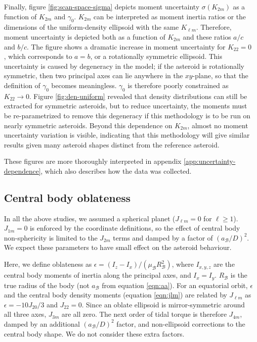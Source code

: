 \documentclass[fleqn,usenatbib]{mnras}
\begin{document}
Finally, figure \ref{fig:scan-space-sigma} depicts moment uncertainty $\sigma(K_{2m})$ as a function of $K_{2m}$ and $\gamma_0$. $K_{2m}$ can be interpreted as moment inertia ratios or the dimensions of the uniform-density ellipsoid with the same $K_{\ell m}$. Therefore, moment uncertainty is depicted both as a function of $K_{2m}$ and these ratios $a/c$ and $b/c$. The figure shows a dramatic increase in moment uncertainty for $K_{22} = 0$, which corresponds to $a=b$, or a rotationally symmetric ellipsoid. This uncertainty is caused by degeneracy in the model; if the asteroid is rotationally symmetric, then two principal axes can lie anywhere in the $xy$-plane, so that the definition of $\gamma_0$ becomes meaningless. $\gamma_0$ is therefore poorly constrained as $K_{22} \rightarrow 0$. Figure \ref{fig:den-uniform} revealed that density distributions can still be extracted for symmetric asteroids, but to reduce uncertainty, the moments must be re-parametrized to remove this degeneracy if this methodology is to be run on nearly symmetric asteroids. Beyond this dependence on $K_{2m}$, almost no moment uncertainty variation is visible, indicating that this methodology will give similar results given many asteroid shapes distinct from the reference asteroid.

These figures are more thoroughly interpreted in appendix \ref{app:uncertainty-dependence}, which also describes how the data was collected.


\subsection{Central body oblateness}
\label{sec:scan-oblateness}

In all the above studies, we assumed a spherical planet ($J_{\ell m} = 0$ for $\ell \geq 1$). $J_{1m} = 0$ is enforced by the coordinate definitions, so the effect of central body non-sphericity is limited to the $J_{2m}$ terms and damped by a factor of $(a_\mathcal{B} / D)^2$. We expect these parameters to have small effect on the asteroid behaviour.

Here, we define oblateness as $\epsilon = (I_z - I_x)/(\mu_\mathcal{B} R_\mathcal{B}^2)$, where $I_{x,y,z}$ are the central body moments of inertia along the principal axes, and $I_x = I_y$. $R_\mathcal{B}$ is the true radius of the body (not $a_\mathcal{B}$ from equation \ref{eqn:aa}). For an equatorial orbit, $\epsilon$ and the central body density moments (equation \ref{eqn:jlm}) are related by $J_{\ell m}$ as $\epsilon = -10J_{20}/3$ and $J_{22} = 0$. Since an oblate ellipsoid is mirror-symmetric around all three axes, $J_{3m}$ are all zero. The next order of tidal torque is therefore $J_{4m}$, damped by an additional $(a_\mathcal{B}/D)^2$ factor, and non-ellipsoid corrections to the central body shape. We do not consider these extra factors.
\end{document}
